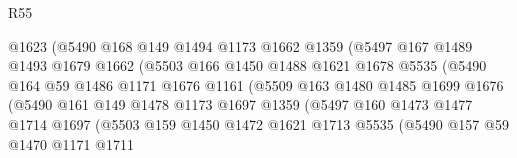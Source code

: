 \begin{lexlean}{R55}
\begin{coremodule}
                            @1623
                            (@5490
                              @168
                              @149
                              @1494
                              @1173
                              @1662
                              @1359
                              (@5497
                                @167
                                @1489
                                @1493
                                @1679
                                @1662
                                (@5503
                                  @166
                                  @1450
                                  @1488
                                  @1621
                                  @1678
                                  @5535
                                  (@5490
                                    @164
                                    @59
                                    @1486
                                    @1171
                                    @1676
                                    @1161
                                    (@5509
                                      @163
                                      @1480
                                      @1485
                                      @1699
                                      @1676
                                      (@5490
                                        @161
                                        @149
                                        @1478
                                        @1173
                                        @1697
                                        @1359
                                        (@5497
                                          @160
                                          @1473
                                          @1477
                                          @1714
                                          @1697
                                          (@5503
                                            @159
                                            @1450
                                            @1472
                                            @1621
                                            @1713
                                            @5535
                                            (@5490
                                              @157
                                              @59
                                              @1470
                                              @1171
                                              @1711

\end{coremodule}
\end{lexlean}
